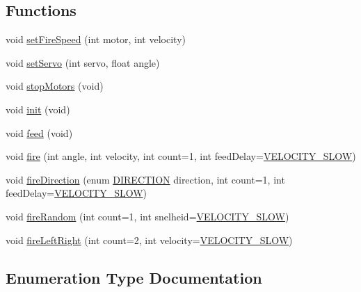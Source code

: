 \subsection*{Functions}
\begin{DoxyCompactItemize}
\item 
void \mbox{\hyperlink{namespace_training_ae351ffcdd0f27d4185db28a1a15c03f4}{set\+Fire\+Speed}} (int motor, int velocity)
\item 
void \mbox{\hyperlink{namespace_training_a96a1d8388782f92fc61635d91ef9c897}{set\+Servo}} (int servo, float angle)
\item 
void \mbox{\hyperlink{namespace_training_a591534cde78f019ac71e59726b245d13}{stop\+Motors}} (void)
\item 
void \mbox{\hyperlink{namespace_training_a5780d5517d3844d33e2b1580a357f5d7}{init}} (void)
\item 
void \mbox{\hyperlink{namespace_training_a44e70e37dd1ef439a2e92c3b69ab3b79}{feed}} (void)
\item 
void \mbox{\hyperlink{namespace_training_a25b00da6c3717c5a9a7ade178154f8ab}{fire}} (int angle, int velocity, int count=1, int feed\+Delay=\mbox{\hyperlink{config_8h_ad03aa78abd1ccf6ef0d5ce525fd2b6e3}{V\+E\+L\+O\+C\+I\+T\+Y\+\_\+\+S\+L\+OW}})
\item 
void \mbox{\hyperlink{namespace_training_a34c927580fe04da9e782020f263cbb0d}{fire\+Direction}} (enum \mbox{\hyperlink{namespace_training_a8174b4453347140eff551a8d9baec7ed}{D\+I\+R\+E\+C\+T\+I\+ON}} direction, int count=1, int feed\+Delay=\mbox{\hyperlink{config_8h_ad03aa78abd1ccf6ef0d5ce525fd2b6e3}{V\+E\+L\+O\+C\+I\+T\+Y\+\_\+\+S\+L\+OW}})
\item 
void \mbox{\hyperlink{namespace_training_ab47b64162371d09b3fb2196ad8a153a4}{fire\+Random}} (int count=1, int snelheid=\mbox{\hyperlink{config_8h_ad03aa78abd1ccf6ef0d5ce525fd2b6e3}{V\+E\+L\+O\+C\+I\+T\+Y\+\_\+\+S\+L\+OW}})
\item 
void \mbox{\hyperlink{namespace_training_a0361ba330b0610c92ce6be9384fbcbd0}{fire\+Left\+Right}} (int count=2, int velocity=\mbox{\hyperlink{config_8h_ad03aa78abd1ccf6ef0d5ce525fd2b6e3}{V\+E\+L\+O\+C\+I\+T\+Y\+\_\+\+S\+L\+OW}})
\end{DoxyCompactItemize}


\subsection{Enumeration Type Documentation}
\mbox{\label{namespace_training_a8174b4453347140eff551a8d9baec7ed}} 
